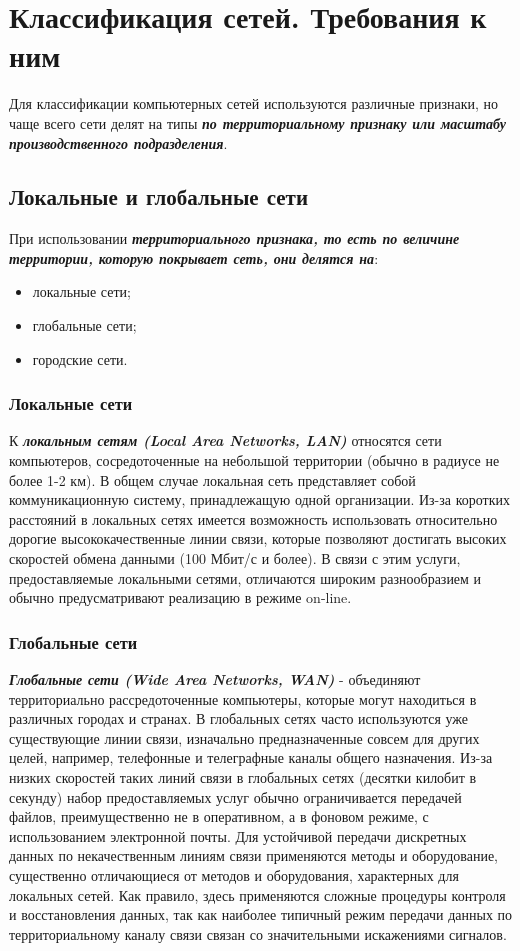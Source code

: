 \chapter{Классификация сетей. Требования к ним}

Для классификации компьютерных сетей используются различные признаки, но чаще всего сети делят на типы \textbf{\textit{по территориальному признаку или масштабу производственного подразделения}}.

\section{Локальные и глобальные сети}

При использовании \textbf{\textit{территориального признака, то есть по величине территории, которую покрывает сеть, они делятся на}}:
\begin{itemize}
    \item локальные сети;
    \item глобальные сети;
    \item городские сети.
\end{itemize}

\subsection{Локальные сети}

К  \textbf{\textit{локальным сетям (Local Area Networks, LAN)}} относятся сети компьютеров, сосредоточенные на небольшой территории (обычно в радиусе не более 1-2 км).
В общем случае локальная сеть представляет собой коммуникационную систему, принадлежащую одной организации.
Из-за коротких расстояний в локальных сетях имеется возможность использовать относительно дорогие высококачественные линии связи, которые позволяют достигать высоких скоростей обмена данными (100 Мбит/с и более). В связи с этим услуги, предоставляемые локальными сетями, отличаются широким разнообразием и обычно предусматривают реализацию в режиме on-line.

\subsection{Глобальные сети}

\textbf{\textit{Глобальные сети (Wide Area Networks, WAN)}} - объединяют территориально рассредоточенные компьютеры, которые могут находиться в различных городах и странах.
В глобальных сетях часто используются уже существующие линии связи, изначально предназначенные совсем для других целей, например, телефонные и телеграфные каналы общего назначения.
Из-за низких скоростей таких линий связи в глобальных сетях (десятки килобит в секунду) набор предоставляемых услуг обычно ограничивается передачей файлов, преимущественно не в оперативном, а в фоновом режиме, с использованием электронной почты.
Для устойчивой передачи дискретных данных по некачественным линиям связи применяются методы и оборудование, существенно отличающиеся от методов и оборудования, характерных для локальных сетей.
Как правило, здесь применяются сложные процедуры контроля и восстановления данных, так как наиболее типичный режим передачи данных по территориальному каналу связи связан со значительными искажениями сигналов.

